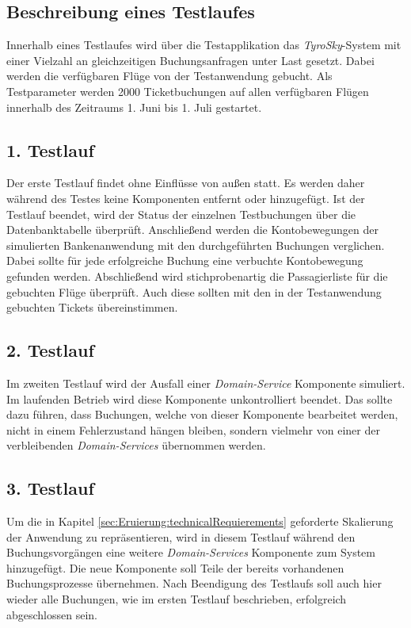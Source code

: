 \subsection{Beschreibung eines Testlaufes}
Innerhalb eines Testlaufes wird über die Testapplikation das \textit{TyroSky}-System mit einer Vielzahl an gleichzeitigen Buchungsanfragen unter Last gesetzt. Dabei werden die verfügbaren Flüge von der Testanwendung gebucht. Als Testparameter werden {2000} Ticketbuchungen auf allen verfügbaren Flügen innerhalb des Zeitraums 1. Juni bis 1. Juli gestartet. \\

\subsection{1. Testlauf}
Der erste Testlauf findet ohne Einflüsse von außen statt. Es werden daher während des Testes keine Komponenten entfernt oder hinzugefügt. Ist der Testlauf beendet, wird der Status der einzelnen Testbuchungen über die Datenbanktabelle überprüft. Anschließend werden die Kontobewegungen der simulierten Bankenanwendung mit den durchgeführten Buchungen verglichen. Dabei sollte für jede erfolgreiche Buchung eine verbuchte Kontobewegung gefunden werden. Abschließend wird stichprobenartig die Passagierliste für die gebuchten Flüge überprüft. Auch diese sollten mit den in der Testanwendung gebuchten Tickets übereinstimmen. \\

\subsection{2. Testlauf}
Im zweiten Testlauf wird der Ausfall einer \textit{Domain-Service} Komponente simuliert.  Im laufenden Betrieb wird diese Komponente unkontrolliert beendet. Das sollte dazu führen, dass Buchungen, welche von dieser Komponente bearbeitet werden, nicht in einem Fehlerzustand hängen bleiben, sondern vielmehr von einer der verbleibenden \textit{Domain-Services} übernommen werden. 

\subsection{3. Testlauf}
Um die in Kapitel \ref{sec:Eruierung:technicalRequierements} geforderte Skalierung der Anwendung zu repräsentieren, wird in diesem Testlauf während den Buchungsvorgängen eine weitere  \textit{Domain-Services} Komponente zum System hinzugefügt. Die neue Komponente soll Teile der bereits vorhandenen Buchungsprozesse übernehmen. Nach Beendigung des Testlaufs soll auch hier wieder alle Buchungen, wie im ersten Testlauf beschrieben, erfolgreich abgeschlossen sein. 

